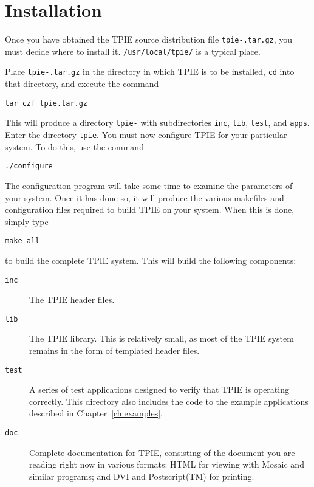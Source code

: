 \section{Installation}

Once you have obtained the TPIE source distribution file
{\tt tpie-\version.tar.gz}, you must decide where to install it.
\verb|/usr/local/tpie/| is a typical place.

Place {\tt tpie-\version.tar.gz} in the directory in which TPIE is to
be installed, \verb|cd| into that directory, and execute the command

\begin{verbatim}
tar czf tpie.tar.gz
\end{verbatim}

This will produce a directory {\tt tpie-\version} with subdirectories
\verb|inc|, \verb|lib|, \verb|test|, and \verb|apps|.  Enter the
directory \verb|tpie|.  You must now configure TPIE for your
particular system.  To do this, use the command

\begin{verbatim}
./configure
\end{verbatim}

The configuration program will take some time to
examine the parameters of your system.  Once it has done so, it will
produce the various makefiles and configuration files required to
build TPIE on your system.  When this is done, simply type

\begin{verbatim}
make all
\end{verbatim}

to build the complete TPIE system.  This will build the following
components:

\begin{description}
\item[\verb|inc|] The TPIE header files.
\item[\verb|lib|] The TPIE library.  This is relatively small, as most
  of the TPIE system remains in the form of templated header
  files.
\item[\verb|test|] A series of test applications designed to verify
  that TPIE is operating correctly.  This directory also includes the
  code to the example applications described in
  Chapter~\ref{ch:examples}.
\item[\verb|doc|] Complete documentation for TPIE, consisting of the
  document you are reading right now in various formats: HTML for
  viewing with Mosaic and similar programs; and DVI and Postscript(TM)
  for printing.
\end{description}

